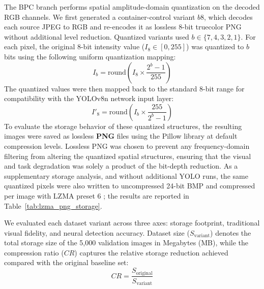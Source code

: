 \documentclass[12pt, a4paper]{article}
\begin{document}
The BPC branch performs spatial amplitude-domain quantization on the decoded RGB channels. We first generated a container-control variant $b8$, which decodes each source JPEG to RGB and re-encodes it as lossless 8-bit truecolor PNG without additional level reduction. Quantized variants used $b \in \{7, 4, 3, 2, 1\}$. For each pixel, the original 8-bit intensity value ($I_{8} \in [0, 255]$) was quantized to $b$ bits using the following uniform quantization mapping:
\begin{equation}
I_{b} = \text{round}\left(I_{8} \times \frac{2^b - 1}{255}\right)
\label{eq:quant}
\end{equation}
The quantized values were then mapped back to the standard 8-bit range for compatibility with the YOLOv8n network input layer:
\begin{equation}
I'_{8} = \text{round}\left(I_{b} \times \frac{255}{2^b - 1}\right)
\label{eq:dequant}
\end{equation}
To evaluate the storage behavior of these quantized structures, the resulting images were saved as lossless \textbf{PNG} files using the Pillow library at default compression levels. Lossless PNG was chosen to prevent any frequency-domain filtering from altering the quantized spatial structures, ensuring that the visual and task degradation was solely a product of the bit-depth reduction. As a supplementary storage analysis, and without additional YOLO runs, the same quantized pixels were also written to uncompressed 24-bit BMP and compressed per image with LZMA preset 6 \cite{pavlov2013}; the results are reported in Table~\ref{tab:lzma_png_storage}.

We evaluated each dataset variant across three axes: storage footprint, traditional visual fidelity, and neural detection accuracy. Dataset size ($S_{\text{variant}}$) denotes the total storage size of the 5,000 validation images in Megabytes (MB), while the compression ratio ($CR$) captures the relative storage reduction achieved compared with the original baseline set:
    \begin{equation}
    CR = \frac{S_{\text{original}}}{S_{\text{variant}}}
    \label{eq:cr}
    \end{equation}
\end{document}
